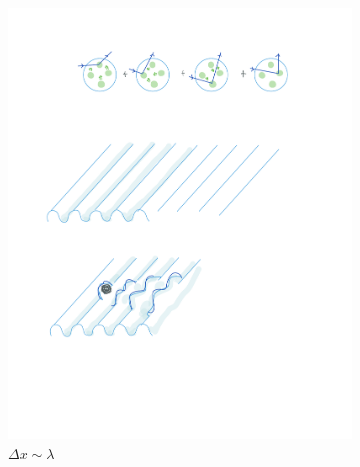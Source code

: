 \documentclass[12pt, oneside]{report}    %
\begin{document}
\begin{figure}
\begin{subfigure}{0.3\textwidth}
        \includegraphics[width=\linewidth]{figures/waves_med.pdf}
        \caption{$\Delta x \sim \lambda$}
        \label{fig:subfig:waves:med}
    \end{subfigure}\;%
    \begin{subfigure}{0.3\textwidth}
    \centering

\end{subfigure}
\end{figure}
\end{document}
